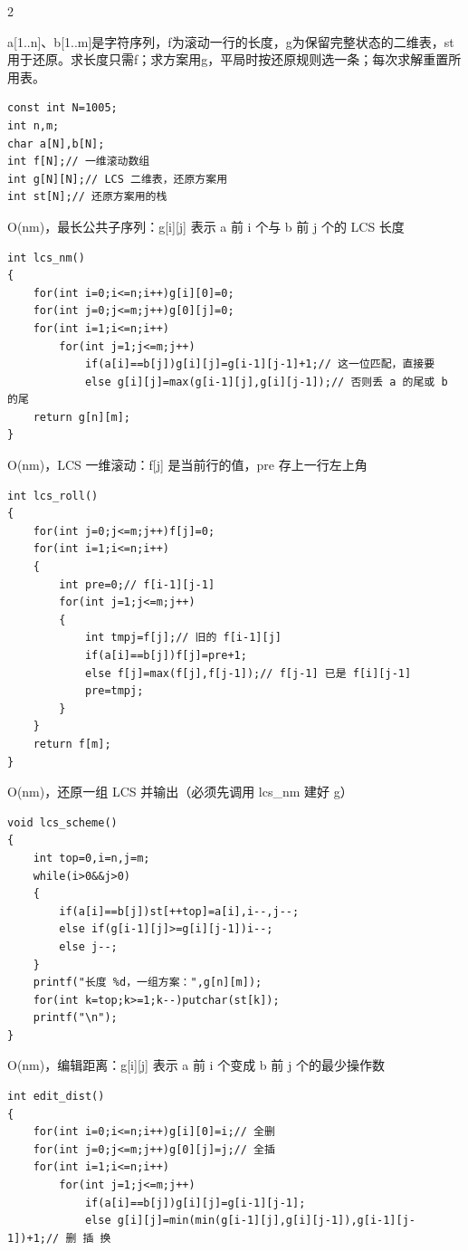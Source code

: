 \documentclass[UTF8,fontset=fandol,a4paper,twoside]{ctexart}
\newcommand{\note}[1]{{\fontsize{10}{12}\selectfont #1\par}}
\begin{document}
\begin{multicols}{2}
\note{a[\allowbreak{}1.\allowbreak{}.\allowbreak{}n]\allowbreak{}、b[\allowbreak{}1.\allowbreak{}.\allowbreak{}m]\allowbreak{}是字符序列，f为滚动一行的长度，g为保留完整状态的二维表，st用于还原。求长度只需f；求方案用g，平局时按还原规则选一条；每次求解重置所用表。}
\begin{lstlisting}
const int N=1005;
int n,m;
char a[N],b[N];
int f[N];// 一维滚动数组
int g[N][N];// LCS 二维表，还原方案用
int st[N];// 还原方案用的栈
\end{lstlisting}
\note{O(\allowbreak{}nm)\allowbreak{}，最长公共子序列：g[\allowbreak{}i]\allowbreak{}[\allowbreak{}j]\allowbreak{} 表示 a 前 i 个与 b 前 j 个的 LCS 长度}
\begin{lstlisting}
int lcs_nm()
{
    for(int i=0;i<=n;i++)g[i][0]=0;
    for(int j=0;j<=m;j++)g[0][j]=0;
    for(int i=1;i<=n;i++)
        for(int j=1;j<=m;j++)
            if(a[i]==b[j])g[i][j]=g[i-1][j-1]+1;// 这一位匹配，直接要
            else g[i][j]=max(g[i-1][j],g[i][j-1]);// 否则丢 a 的尾或 b 的尾
    return g[n][m];
}
\end{lstlisting}
\note{O(\allowbreak{}nm)\allowbreak{}，LCS 一维滚动：f[\allowbreak{}j]\allowbreak{} 是当前行的值，pre 存上一行左上角}
\begin{lstlisting}
int lcs_roll()
{
    for(int j=0;j<=m;j++)f[j]=0;
    for(int i=1;i<=n;i++)
    {
        int pre=0;// f[i-1][j-1]
        for(int j=1;j<=m;j++)
        {
            int tmpj=f[j];// 旧的 f[i-1][j]
            if(a[i]==b[j])f[j]=pre+1;
            else f[j]=max(f[j],f[j-1]);// f[j-1] 已是 f[i][j-1]
            pre=tmpj;
        }
    }
    return f[m];
}
\end{lstlisting}
\note{O(\allowbreak{}nm)\allowbreak{}，还原一组 LCS 并输出（必须先调用 lcs\_nm 建好 g）}
\begin{lstlisting}
void lcs_scheme()
{
    int top=0,i=n,j=m;
    while(i>0&&j>0)
    {
        if(a[i]==b[j])st[++top]=a[i],i--,j--;
        else if(g[i-1][j]>=g[i][j-1])i--;
        else j--;
    }
    printf("长度 %d，一组方案：",g[n][m]);
    for(int k=top;k>=1;k--)putchar(st[k]);
    printf("\n");
}
\end{lstlisting}
\note{O(\allowbreak{}nm)\allowbreak{}，编辑距离：g[\allowbreak{}i]\allowbreak{}[\allowbreak{}j]\allowbreak{} 表示 a 前 i 个变成 b 前 j 个的最少操作数}
\begin{lstlisting}
int edit_dist()
{
    for(int i=0;i<=n;i++)g[i][0]=i;// 全删
    for(int j=0;j<=m;j++)g[0][j]=j;// 全插
    for(int i=1;i<=n;i++)
        for(int j=1;j<=m;j++)
            if(a[i]==b[j])g[i][j]=g[i-1][j-1];
            else g[i][j]=min(min(g[i-1][j],g[i][j-1]),g[i-1][j-1])+1;// 删 插 换

\end{lstlisting}
\end{multicols}
\end{document}
